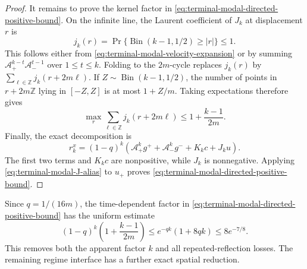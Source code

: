 \begin{proof}
It remains to prove the kernel factor in
\eqref{eq:terminal-modal-directed-positive-bound}.  On the infinite line,
the Laurent coefficient of $J_k$ at displacement $r$ is
\begin{equation}
 j_k(r)=
 \Pr\{\operatorname{Bin}(k-1,1/2)\ge |r|\}\le1.
 \label{eq:terminal-modal-J-tail}
\end{equation}
This follows either from \eqref{eq:terminal-modal-velocity-expansion} or by
summing
$\mathcal A_+^{k-t}\mathcal A_-^{t-1}$ over $1\le t\le k$.
Folding to the $2m$-cycle replaces $j_k(r)$ by
$\sum_{\ell\in\mathbb Z}j_k(r+2m\ell)$.  If
$Z\sim\operatorname{Bin}(k-1,1/2)$, the number of points in
$r+2m\mathbb Z$ lying in $[-Z,Z]$ is at most $1+Z/m$.  Taking expectations
therefore gives
\begin{equation}
 \max_r\sum_{\ell\in\mathbb Z}j_k(r+2m\ell)
 \le1+\frac{k-1}{2m}.
 \label{eq:terminal-modal-J-alias}
\end{equation}
Finally, the exact decomposition is
\[
 r_k^x=(1-q)^k\left(
 \mathcal A_+^kg^++\mathcal A_-^kg^-+K_kc+J_ku\right).
\]
The first two terms and $K_kc$ are nonpositive, while $J_k$ is
nonnegative.  Applying \eqref{eq:terminal-modal-J-alias} to $u_+$ proves
\eqref{eq:terminal-modal-directed-positive-bound}.
\end{proof}

Since $q=1/(16m)$, the time-dependent factor in
\eqref{eq:terminal-modal-directed-positive-bound} has the uniform estimate
\begin{equation}
 (1-q)^k\left(1+\frac{k-1}{2m}\right)
 \le e^{-qk}(1+8qk)\le 8e^{-7/8}.
 \label{eq:terminal-modal-directed-damping}
\end{equation}
This removes both the apparent factor $k$ and all repeated-reflection losses.
The remaining regime interface has a further exact spatial reduction.


